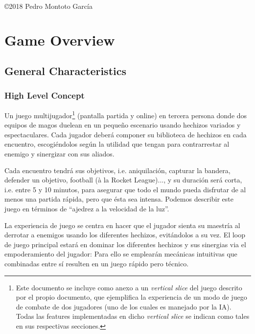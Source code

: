 \documentclass[12pt]{report}
\newcommand*\cleartoleftpage{%
  \clearpage
  \ifodd\value{page}\hbox{}\newpage\fi
}
\begin{document}
\vfill %

{\centering \hfill \copyright 2018 Pedro Montoto García} \\


\clearpage

\tableofcontents

\setlength{\voffset}{0cm}
\setlength{\parindent}{1cm}
\setcounter{page}{1}

\cleartoleftpage

\part{Game Overview}

\chapter{General Characteristics}

\section{High Level Concept}
\pagestyle{fancy}

Un juego multijugador\footnote{Este documento se incluye como anexo a un \textit{vertical slice} del juego descrito por el propio documento, que ejemplifica la experiencia de un modo de juego de combate de dos jugadores (uno de los cuales es manejado por la IA). Todas las features implementadas en dicho \textit{vertical slice} se indican como tales en sus respectivas secciones.} (pantalla partida y online) en tercera persona donde dos equipos de magos duelean en un pequeño escenario usando hechizos variados y espectaculares. Cada jugador deberá componer su biblioteca de hechizos en cada encuentro, escogiéndolos según la utilidad que tengan para contrarrestar al enemigo y sinergizar con sus aliados.

Cada encuentro tendrá sus objetivos, i.e. aniquilación, capturar la bandera, defender un objetivo, football (à la Rocket League)..., y su duración será corta, i.e. entre 5 y 10 minutos, para asegurar que todo el mundo pueda disfrutar de al menos una partida rápida, pero que ésta sea intensa. Podemos describir este juego en términos de ``ajedrez a la velocidad de la luz''.

La experiencia de juego se centra en hacer que el jugador sienta su maestría al derrotar a enemigos usando los diferentes hechizos, evitándolos a su vez. El loop de juego principal estará en dominar los diferentes hechizos y sus sinergias via el empoderamiento del jugador: Para ello se emplearán mecánicas intuitivas que combinadas entre sí resulten en un juego rápido pero técnico.
\end{document}
